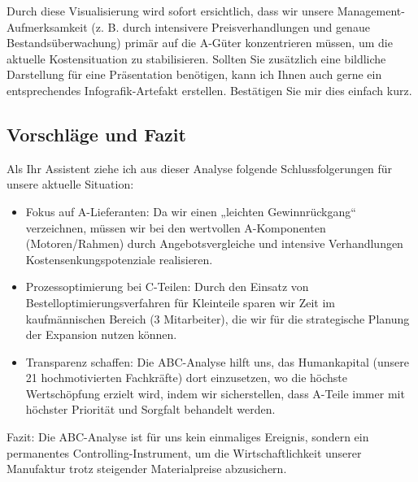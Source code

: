 \documentclass[12pt, a4paper]{article}
\begin{document}
Durch diese Visualisierung wird sofort ersichtlich, dass wir unsere Management-Aufmerksamkeit 
(z. B. durch intensivere Preisverhandlungen und genaue Bestandsüberwachung) primär auf die A-Güter 
konzentrieren müssen, um die aktuelle Kostensituation zu stabilisieren.
Sollten Sie zusätzlich eine bildliche Darstellung für eine Präsentation benötigen, kann ich Ihnen auch 
gerne ein entsprechendes Infografik-Artefakt erstellen. Bestätigen Sie mir dies einfach kurz.


\subsection{Vorschläge und Fazit}
Als Ihr Assistent ziehe ich aus dieser Analyse folgende Schlussfolgerungen für unsere aktuelle Situation:
\begin{itemize}
    \item Fokus auf A-Lieferanten: Da wir einen „leichten Gewinnrückgang“ verzeichnen, müssen wir bei den wertvollen A-Komponenten (Motoren/Rahmen) durch Angebotsvergleiche und intensive Verhandlungen Kostensenkungspotenziale realisieren.
    \item Prozessoptimierung bei C-Teilen: Durch den Einsatz von Bestelloptimierungsverfahren für Kleinteile sparen wir Zeit im kaufmännischen Bereich (3 Mitarbeiter), die wir für die strategische Planung der Expansion nutzen können.
    \item Transparenz schaffen: Die ABC-Analyse hilft uns, das Humankapital (unsere 21 hochmotivierten Fachkräfte) dort einzusetzen, wo die höchste Wertschöpfung erzielt wird, indem wir sicherstellen, dass A-Teile immer mit höchster Priorität und Sorgfalt behandelt werden.
\end{itemize}

Fazit: Die ABC-Analyse ist für uns kein einmaliges Ereignis, sondern ein permanentes Controlling-Instrument, 
um die Wirtschaftlichkeit unserer Manufaktur trotz steigender Materialpreise abzusichern.
\end{document}
